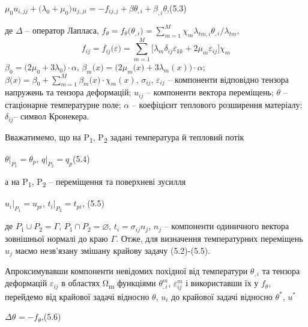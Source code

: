 $\mu_{0}{u_{i,\mathit{\text{jj}}} + (}{\lambda_{0} + \mu_{0}}){u_{j,\mathit{\text{ji}}} = {{- f_{\mathit{\text{ij}},j}} + \beta\theta_{,i} + \beta_{,i}}}\theta$,(5.3)

\noindent де $\Delta$ -- оператор Лапласа,
${f_{\theta} = f_{\theta}}(\theta_{,i}{) = {\sum\limits_{m = 1}^{M}{\chi_{m}\lambda_{\mathit{\text{tm}},i}{\theta_{,i}/\lambda_{\mathit{\text{tm}}}}}}}$,
\begin{equation*}
    {f_{\mathit{\text{ij}}} = f_{\mathit{\text{ij}}}}(\varepsilon{) = {\sum\limits_{m = 1}^{M}{\lbrack\lambda_{m}\delta_{\mathit{\text{ij}}}{\varepsilon_{\mathit{\text{kk}}} + 2}\mu_{m}\varepsilon_{\mathit{\text{ij}}}\rbrack\chi_{m}}}}    
\end{equation*}
${\beta_{0} = (}2{\mu_{0} + 3}\lambda_{0}{) \cdot \alpha}$, $\beta_{m}(x{) = (}2\mu_{m}(x{) + 3}\lambda_{m}(x){) \cdot
\alpha}$; $\beta(x{) = {\beta_{0} + {\sum\limits_{m = 1}^{M}{\beta_{m}(x{) \cdot \chi_{m}}(x)}}}}$, $\sigma_{ij}$,
$\varepsilon_{ij}$ -- компоненти відповідно тензора напружень та тензора деформацій; $u_{ij}$ -- компоненти вектора
переміщень; $\theta$ -- стаціонарне температурне поле; $\alpha$ -- коефіцієнт теплового розширення матеріалу;
$\delta_{ij}$-- символ Кронекера.

\noindent Вважатимемо, що на P\textsubscript{1}, P\textsubscript{2 } задані температура й тепловий потік

$\theta{|_{P_{1}} = \theta_{p}}$,
$q{|_{P_{2}} = q_{p}}$(5.4)

\noindent а на P\textsubscript{1}, P\textsubscript{2 } -- переміщення та поверхневі зусилля

$u_{i}{|_{P_{1}} = u_{\mathit{\text{pi}}}}$,
$t_{i}{|_{P_{2}} = t_{\mathit{\text{pi}}}}$, (5.5)

\noindent де ${P_{1} \cup P_{2}} = \Gamma$, ${P_{1} \cap P_{2}} = \varnothing$, $t_i=\sigma_{ij}n_j$, $n_j$ --
компоненти одиничного вектора зовнішньої нормалі до краю $\Gamma$. Отже, для визначення температурних переміщень $u_j$
маємо незв'язану змішану крайову задачу (5.2)-(5.5).

Апроксимувавши компоненти невідомих похідної від температури $\theta_{,i}$ та тензора деформацій $\varepsilon_{ij}$ в
областях Ω\textsubscript{m} функціями $\theta_{,i}^{m}$, $\varepsilon_{\mathit{\text{ij}}}^{m}$ і використавши їх у
$f_{\theta}$, перейдемо від крайової задачі відносно $\theta$, $u_i$ до крайової задачі відносно $\theta^*$, $u^*$

$\mathit{\Delta\theta}^{} = {- f_{\theta}}$,(5.6)


